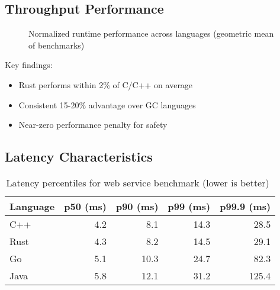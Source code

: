 \documentclass[11pt]{article}
\begin{document}
\subsection{Throughput Performance}

\begin{figure}[h]
\centering
{}
\caption{Normalized runtime performance across languages (geometric mean of benchmarks)}
\label{fig:perf_comprehensive}
\end{figure}

Key findings:
\begin{itemize}
    \item Rust performs within 2\% of C/C++ on average
    \item Consistent 15-20\% advantage over GC languages
    \item Near-zero performance penalty for safety
\end{itemize}

\subsection{Latency Characteristics}

\begin{table}[h]
\centering
\begin{tabular}{@{}lrrrr@{}}
\toprule
\textbf{Language} & \textbf{p50 (ms)} & \textbf{p90 (ms)} & \textbf{p99 (ms)} & \textbf{p99.9 (ms)} \\
\midrule
C++ & 4.2 & 8.1 & 14.3 & 28.5 \\
Rust & 4.3 & 8.2 & 14.5 & 29.1 \\
Go & 5.1 & 10.3 & 24.7 & 82.3 \\
Java & 5.8 & 12.1 & 31.2 & 125.4 \\
\bottomrule
\end{tabular}
\caption{Latency percentiles for web service benchmark (lower is better)~\cite{techempower2023}}
\label{tab:latency}
\end{table}
\end{document}
